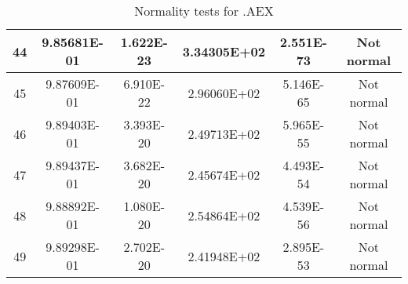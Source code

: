 \begin{table}[h]
\begin{tabular}{|c|c|c|c|c|c|}
		44 & 9.85681E-01 & 1.622E-23 & 3.34305E+02 & 2.551E-73 & Not normal\\\hline
		45 & 9.87609E-01 & 6.910E-22 & 2.96060E+02 & 5.146E-65 & Not normal\\\hline
		46 & 9.89403E-01 & 3.393E-20 & 2.49713E+02 & 5.965E-55 & Not normal\\\hline
		47 & 9.89437E-01 & 3.682E-20 & 2.45674E+02 & 4.493E-54 & Not normal\\\hline
		48 & 9.88892E-01 & 1.080E-20 & 2.54864E+02 & 4.539E-56 & Not normal\\\hline
		49 & 9.89298E-01 & 2.702E-20 & 2.41948E+02 & 2.895E-53 & Not normal\\\hline
	\end{tabular}
	\caption{Normality tests for .AEX}
\end{table}
